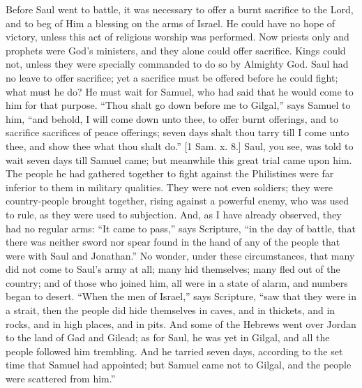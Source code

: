 Before Saul went to battle, it was necessary to offer a burnt
sacrifice to the Lord, and to beg of Him a blessing on the arms of
Israel. He could have no hope of victory, unless this act of religious
worship was performed. Now priests only and prophets were God's
ministers, and they alone could offer sacrifice. Kings could not,
unless they were specially commanded to do so by Almighty God. Saul
had no leave to offer sacrifice; yet a sacrifice must be offered
before he could fight; what must he do? He must wait for Samuel, who
had said that he would come to him for that purpose. ``Thou shalt
go down before me to Gilgal,'' says Samuel to him, ``and
behold, I will come down unto thee, to offer burnt offerings, and to
sacrifice sacrifices of peace offerings; seven days shalt thou tarry
till I come unto thee, and show thee what thou shalt do.'' [1 Sam.
x. 8.] Saul, you see, was told to wait seven days till Samuel came;
but meanwhile this great trial came upon him. The people he had
gathered together to fight against the Philistines were far inferior
to them in military qualities. They were not even soldiers; they were
country-people brought together, rising against a powerful enemy, who
was used to rule, as they were used to subjection. And, as I have
already observed, they had no regular arms: ``It came to pass,'' says Scripture, ``in the day of battle,
that there was
neither sword nor spear found in the hand of any of the people that
were with Saul and Jonathan.'' No wonder, under these
circumstances, that many did not come to Saul's army at all; many hid
themselves; many fled out of the country; and of those who joined him,
all were in a state of alarm, and numbers began to desert. ``When
the men of Israel,'' says Scripture, ``saw that they were in a
strait, then the people did hide themselves in caves, and in thickets,
and in rocks, and in high places, and in pits. And some of the Hebrews
went over Jordan to the land of Gad and Gilead; as for Saul, he was
yet in Gilgal, and all the people followed him trembling. And he
tarried seven days, according to the set time that Samuel had
appointed; but Samuel came not to Gilgal, and the people were
scattered from him.''

